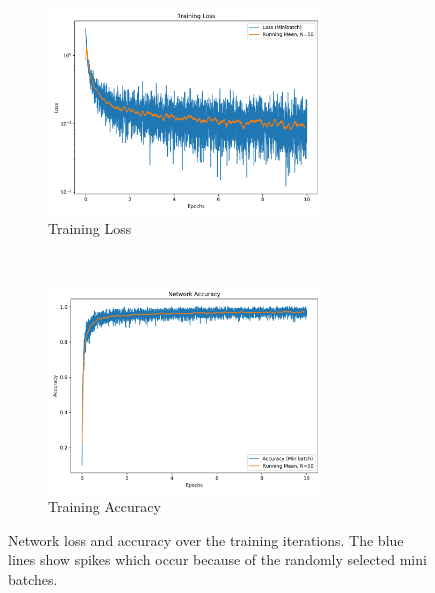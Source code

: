 \begin{figure}[htbp]
\centering
\begin{subfigure}[t]{0.5\textwidth}
	\includegraphics[width=0.8\textwidth]{../../net/images/training_loss}
	\caption{Training Loss}		
	\label{fig:network-train-loss}
\end{subfigure}%
~
\begin{subfigure}[t]{0.5\textwidth}
	\includegraphics[width=0.8\textwidth]{../../net/images/training_accuracy}
	\caption{Training Accuracy}
	\label{fig:network-train-acc}		
\end{subfigure}
\caption[Network loss and accuracy over the training iterations]{Network loss and accuracy over the training iterations. The blue lines show spikes which occur because of the randomly selected mini batches.}
\label{fig:network-training-graphs}
\end{figure}

